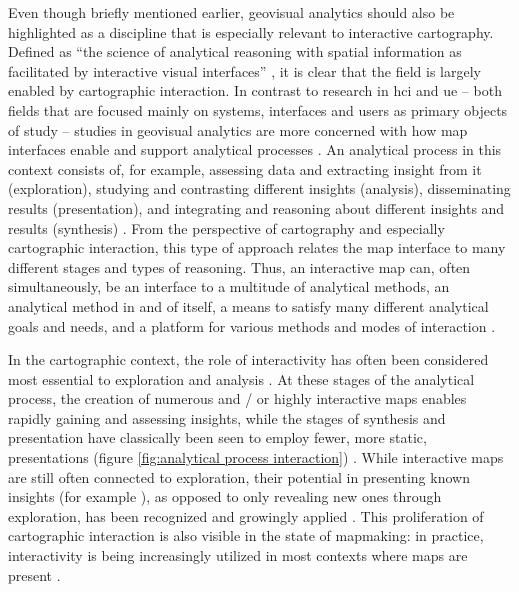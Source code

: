 Even though briefly mentioned earlier,
geovisual analytics should also be highlighted as
a discipline that is especially relevant to interactive cartography.
Defined as \enquote{the science of analytical reasoning with
spatial information as facilitated by interactive visual interfaces}
\parencite{rob2017b},
it is clear that the field is largely enabled by
cartographic interaction.
In contrast to research in \acrshort{hci} and \acrshort{ue} --
both fields that are focused mainly on systems, interfaces and users as primary objects of study
\parencite{mol2023, car1997} --
studies in geovisual analytics are more concerned with
how map interfaces enable and support analytical processes \parencite{rob2017b, and2010}.
An analytical process in this context consists of, for example,
assessing data and extracting insight from it (exploration),
studying and contrasting different insights (analysis),
disseminating results (presentation),
and integrating and reasoning about different insights and results (synthesis) \parencite{mac2017, dib1990}.
From the perspective of cartography and especially cartographic interaction,
this type of approach relates the map interface to many different stages and types of reasoning.
Thus, an interactive map can, often simultaneously, be
an interface to a multitude of analytical methods,
an analytical method in and of itself,
a means to satisfy many different analytical goals and needs,
and a platform for various methods and modes of interaction \parencite{rot2013b, rot2015}.

In the cartographic context,
the role of interactivity has often been considered most essential to
exploration and analysis \parencite{eds2008}.
At these stages of the analytical process,
the creation of numerous and / or highly interactive maps
enables rapidly gaining and assessing insights,
while the stages of synthesis and presentation
have classically been seen to employ fewer,
more static, presentations
(figure \ref{fig:analytical process interaction}) \parencite{dib1990}.
While interactive maps are still often connected to exploration,
their potential in presenting known insights (for example \textcite{ecc2008}),
as opposed to only revealing new ones through exploration,
has been recognized and growingly applied \parencite{fis2021}.
This proliferation of cartographic interaction is also visible in the state of mapmaking:
in practice, interactivity is being increasingly utilized
in most contexts where maps are present \parencite{fis2021, mei2019, rot2015}.

